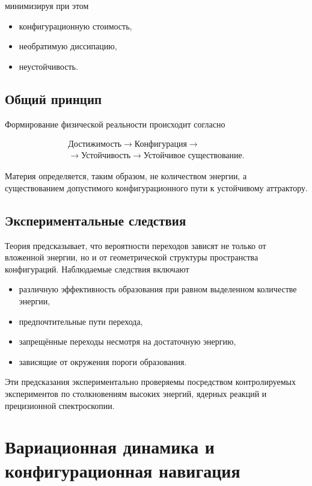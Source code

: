минимизируя при этом

\begin{itemize}
\item конфигурационную стоимость,
\item необратимую диссипацию,
\item неустойчивость.
\end{itemize}

\section{Общий принцип}

Формирование физической реальности происходит согласно

\[ \boxed{ \begin{gathered} \text{Достижимость} \longrightarrow \text{Конфигурация} \longrightarrow \\ \longrightarrow \text{Устойчивость} \longrightarrow \text{Устойчивое существование}. \end{gathered} } \]

Материя определяется, таким образом, не количеством энергии, а существованием допустимого конфигурационного пути к устойчивому аттрактору.

\section{Экспериментальные следствия}

Теория предсказывает, что вероятности переходов зависят не только от вложенной энергии, но и от геометрической структуры пространства конфигураций. Наблюдаемые следствия включают

\begin{itemize}
\item различную эффективность образования
при равном выделенном количестве энергии,
\item предпочтительные пути перехода,
\item запрещённые переходы
несмотря на достаточную энергию,
\item зависящие от окружения
пороги образования.
\end{itemize}

Эти предсказания экспериментально проверяемы посредством контролируемых экспериментов по столкновениям высоких энергий, ядерных реакций и прецизионной спектроскопии.

\chapter{Вариационная динамика и конфигурационная навигация}

